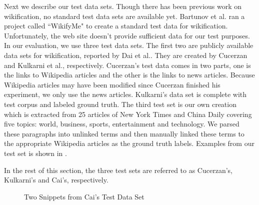 Next we describe our test data sets.
Though there has been previous work on wikification,
no standard test data sets are available yet.
Bartunov et al.\cite{bartunov2011wikifyme} ran a project called
``WikifyMe" to create a standard test data for wikification.
Unfortunately, the web site doesn't provide sufficient data for our
test purposes.
In our evaluation, we use three test data sets.
The first two are publicly available data sets for wikification,
reported by Dai et al.\cite{daientity}.
They are created by Cucerzan \cite{cucerzan2007large} and
Kulkarni et al.\cite{kulkarni2009collective}, respectively.
Cucerzan's test data comes in two parts, one is the links to
Wikipedia articles and the other is the links to news articles.
Because Wikipedia articles may have been modified
since Cucerzan finished his experiment, we only use the news articles.
Kulkarni's data set is complete with test corpus and labeled ground
truth.  The third test set is our own creation which is extracted from
25 articles of New York Times and China Daily covering five topics:
world, business, sports, entertainment and technology.
We parsed these paragraphs into unlinked terms and then
manually linked these terms to the appropriate Wikipedia articles
as the ground truth labels. Examples from our test set is shown in
.

In the rest of this section, the three test sets are referred to as
Cucerzan's, Kulkarni's and Cai's, respectively.

\begin{figure}
\centering
{}
\vspace*{2ex}

\caption{Two Snippets from Cai's Test Data Set}
\label{fig:cai}
\end{figure}

